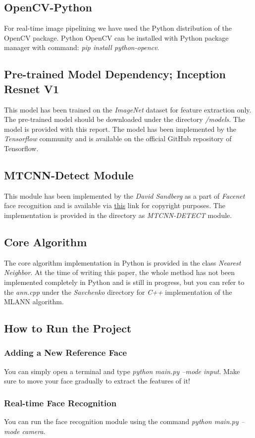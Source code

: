 \subsection{OpenCV-Python}
For real-time image pipelining we have used the Python distribution of the OpenCV package. Python OpenCV can be installed with Python package manager with command: \textit{pip install python-opencv}.

\subsection{Pre-trained Model Dependency; Inception Resnet V1}
This model has been trained on the \textit{ImageNet} dataset for feature extraction only. The pre-trained model should be downloaded under the directory \textit{/models}. The model is provided with this report. The model has been implemented by the \textit{Tensorflow} community and is available on the official GitHub repository of Tensorflow.

\subsection{MTCNN-Detect Module}
This module has been implemented by the \textit{David Sandberg} as a part of \textit{Facenet} face recognition and is available via \href{https://github.com/davidsandberg/facenet}{this} link for copyright purposes. The implementation is provided in the directory as \textit{MTCNN-DETECT} module.

\subsection{Core Algorithm}
The core algorithm implementation in Python is provided in the class \textit{Nearest Neighbor}. At the time of writing this paper, the whole method has not been implemented completely in Python and is still in progress, but you can refer to the \textit{ann.cpp} under the \textit{Savchenko} directory for \textit{C++} implementation of the MLANN algorithm.

\subsection{How to Run the Project}
\subsubsection{Adding a New Reference Face}
You can simply open a terminal and type \textit{python main.py --mode input}. Make sure to move your face gradually to extract the features of it!

\subsubsection{Real-time Face Recognition}
You can run the face recognition module using the command \textit{python main.py --mode camera}.
